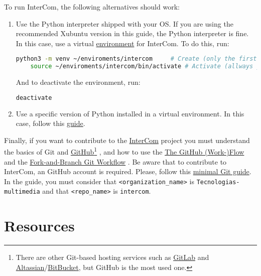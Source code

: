 To run InterCom, the following alternatives should work:
\begin{enumerate}
\item Use the Python interpreter shipped with your OS. If you are
  using the recommended Xubuntu version in this guide, the Python
  interpreter is fine. In this case, use a virtual
  \href{https://docs.python.org/3/library/venv.html}{environment} for
  InterCom. To do this, run:
  \begin{lstlisting}[language=Bash]
    python3 -m venv ~/enviroments/intercom     # Create (only the first time)
    source ~/enviroments/intercom/bin/activate # Activate (allways you run InterCom)
  \end{lstlisting}
  And to deactivate the environment, run:
  \begin{lstlisting}[language=Bash]
    deactivate
  \end{lstlisting}
  
\item Use a specific version of Python installed in a virtual environment. In this case, follow this 
\href{https://vicente-gonzalez-ruiz.github.io/Python_install/}{guide}.

\end{enumerate}

Finally, if you want to contribute to the
\href{https://github.com/Tecnologias-multimedia/intercom}{InterCom}
project \cite{intercom} you must understand the basics of Git
\cite{Git-book} and \href{https://github.com/}{GitHub}\footnote{There
are other Git-based hosting services such as
\href{https://about.gitlab.com/}{GitLab} and
\href{https://www.atlassian.com/git}{Altassian}/\href{https://bitbucket.org/product}{BitBucket},
but GitHub is the most used one.} \cite{GitHub}, and how to use the
\href{https://guides.github.com/introduction/flow/index.html}{The
  GitHub (Work-)Flow} and the
\href{https://github.com/vicente-gonzalez-ruiz/fork_and_branch_git_workflow}{Fork-and-Branch
  Git Workflow} \cite{fork-and-branch-git-workflow}. Be aware that to
contribute to InterCom, an GitHub account is required. Please, follow
this
\href{https://vicente-gonzalez-ruiz.github.io/using_GitHub/}{minimal
  Git guide}. In the guide, you must consider that
\texttt{<organization\_name>} is \texttt{Tecnologias-multimedia} and
that \texttt{<repo\_name>} is \texttt{intercom}.

\section{Resources}


